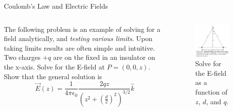 \documentclass{beamer}
\begin{document}
\begin{frame}{Coulomb’s Law and Electric Fields}
\small
\begin{columns}[T]
\begin{column}{0.5\textwidth}
The following problem is an example of solving for a field analytically, and \textit{testing various limits}.  Upon taking limits results are often simple and intuitive. \\ \vspace{0.5cm}
Two charges $+q$ are on the fixed in an insulator on the x-axis.  Solve for the E-field at $P = (0,0,z)$. \\ \vspace{0.5cm}
Show that the general solution is
\begin{equation}
\vec{E}(z) = \frac{1}{4\pi\epsilon_0} \frac{2qz}{\left(z^2+\left(\frac{d}{2}\right)^2\right)^{3/2}} \hat{k}
\end{equation}
\end{column}
\begin{column}{0.5\textwidth}
\begin{figure}
\includegraphics[width=\textwidth]{figures/twoChargesZ.png}
\caption{\label{fig:twoChargesZ} Solve for the E-field as a function of $z$, $d$, and $q$.}
\end{figure}
\end{column}
\end{columns}
\end{frame}
\end{document}
